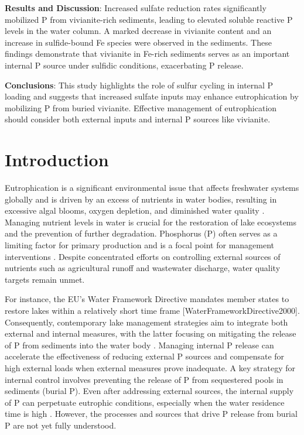 \documentclass[12pt,twoside]{book}
\begin{document}
\noindent \textbf{Results and Discussion}: Increased sulfate reduction rates significantly mobilized P from vivianite-rich sediments, leading to elevated soluble reactive P levels in the water column. A marked decrease in vivianite content and an increase in sulfide-bound Fe species were observed in the sediments. These findings demonstrate that vivianite in Fe-rich sediments serves as an important internal P source under sulfidic conditions, exacerbating P release.

\noindent \textbf{Conclusions}: This study highlights the role of sulfur cycling in internal P loading and suggests that increased sulfate inputs may enhance eutrophication by mobilizing P from buried vivianite. Effective management of eutrophication should consider both external inputs and internal P sources like vivianite.

\section{Introduction}\label{introduction}

Eutrophication is a significant environmental issue that affects freshwater systems globally and is driven by an excess of nutrients in water bodies, resulting in excessive algal blooms, oxygen depletion, and diminished water quality \citep{Correll1998, Ansari2014}. Managing nutrient levels in water is crucial for the restoration of lake ecosystems and the prevention of further degradation. Phosphorus (P) often serves as a limiting factor for primary production and is a focal point for management interventions \citep{Azam2014, Tammeorg2024}. Despite concentrated efforts on controlling external sources of nutrients such as agricultural runoff and wastewater discharge, water quality targets remain unmet.

For instance, the EU's Water Framework Directive mandates member states to restore lakes within a relatively short time frame {[}WaterFrameworkDirective2000{]}. Consequently, contemporary lake management strategies aim to integrate both external and internal measures, with the latter focusing on mitigating the release of P from sediments into the water body \citep{Tammeorg2024}. Managing internal P release can accelerate the effectiveness of reducing external P sources and compensate for high external loads when external measures prove inadequate. A key strategy for internal control involves preventing the release of P from sequestered pools in sediments (burial P). Even after addressing external sources, the internal supply of P can perpetuate eutrophic conditions, especially when the water residence time is high \citep{Sondergaard2001, Wagner2020}. However, the processes and sources that drive P release from burial P are not yet fully understood.
\end{document}

